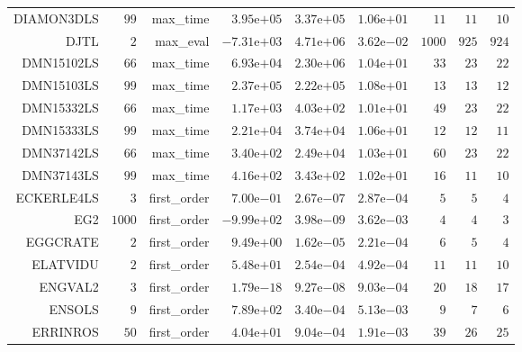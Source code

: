 \begin{longtable}{rrrrrrrrr}
DIAMON3DLS & \(    99\) & max\_time & \( 3.95\)e\(+05\) & \( 3.37\)e\(+05\) & \( 1.06\)e\(+01\) & \(    11\) & \(    11\) & \(    10\) \\
DJTL & \(     2\) & max\_eval & \(-7.31\)e\(+03\) & \( 4.71\)e\(+06\) & \( 3.62\)e\(-02\) & \(  1000\) & \(   925\) & \(   924\) \\
DMN15102LS & \(    66\) & max\_time & \( 6.93\)e\(+04\) & \( 2.30\)e\(+06\) & \( 1.04\)e\(+01\) & \(    33\) & \(    23\) & \(    22\) \\
DMN15103LS & \(    99\) & max\_time & \( 2.37\)e\(+05\) & \( 2.22\)e\(+05\) & \( 1.08\)e\(+01\) & \(    13\) & \(    13\) & \(    12\) \\
DMN15332LS & \(    66\) & max\_time & \( 1.17\)e\(+03\) & \( 4.03\)e\(+02\) & \( 1.01\)e\(+01\) & \(    49\) & \(    23\) & \(    22\) \\
DMN15333LS & \(    99\) & max\_time & \( 2.21\)e\(+04\) & \( 3.74\)e\(+04\) & \( 1.06\)e\(+01\) & \(    12\) & \(    12\) & \(    11\) \\
DMN37142LS & \(    66\) & max\_time & \( 3.40\)e\(+02\) & \( 2.49\)e\(+04\) & \( 1.03\)e\(+01\) & \(    60\) & \(    23\) & \(    22\) \\
DMN37143LS & \(    99\) & max\_time & \( 4.16\)e\(+02\) & \( 3.43\)e\(+02\) & \( 1.02\)e\(+01\) & \(    16\) & \(    11\) & \(    10\) \\
ECKERLE4LS & \(     3\) & first\_order & \( 7.00\)e\(-01\) & \( 2.67\)e\(-07\) & \( 2.87\)e\(-04\) & \(     5\) & \(     5\) & \(     4\) \\
EG2 & \(  1000\) & first\_order & \(-9.99\)e\(+02\) & \( 3.98\)e\(-09\) & \( 3.62\)e\(-03\) & \(     4\) & \(     4\) & \(     3\) \\
EGGCRATE & \(     2\) & first\_order & \( 9.49\)e\(+00\) & \( 1.62\)e\(-05\) & \( 2.21\)e\(-04\) & \(     6\) & \(     5\) & \(     4\) \\
ELATVIDU & \(     2\) & first\_order & \( 5.48\)e\(+01\) & \( 2.54\)e\(-04\) & \( 4.92\)e\(-04\) & \(    11\) & \(    11\) & \(    10\) \\
ENGVAL2 & \(     3\) & first\_order & \( 1.79\)e\(-18\) & \( 9.27\)e\(-08\) & \( 9.03\)e\(-04\) & \(    20\) & \(    18\) & \(    17\) \\
ENSOLS & \(     9\) & first\_order & \( 7.89\)e\(+02\) & \( 3.40\)e\(-04\) & \( 5.13\)e\(-03\) & \(     9\) & \(     7\) & \(     6\) \\
ERRINROS & \(    50\) & first\_order & \( 4.04\)e\(+01\) & \( 9.04\)e\(-04\) & \( 1.91\)e\(-03\) & \(    39\) & \(    26\) & \(    25\) \\

\end{longtable}
